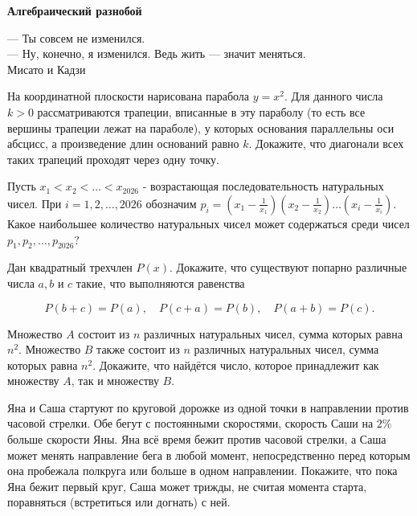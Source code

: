 \centerline{\bf \Huge Алгебраический разнобой}

\begin{flushright}
        \scriptsize{— Ты совсем не изменился.\\— Ну, конечно, я изменился. Ведь жить — значит меняться.\\Мисато и Кадзи}
\end{flushright}

На координатной плоскости нарисована парабола $y=x^2$. Для данного числа $k>0$ рассматриваются трапеции, вписанные в эту параболу (то есть все вершины трапеции лежат на параболе), у которых основания параллельны оси абсцисс, а произведение длин оснований равно $k$. Докажите, что диагонали всех таких трапеций проходят через одну точку.

Пусть $x_1<x_2<\ldots<x_{2026}$ - возрастающая последовательность натуральных чисел. При $i=1,2, \ldots, 2026$ обозначим $p_i=\left(x_1-\frac{1}{x_1}\right)\left(x_2-\frac{1}{x_2}\right) \ldots\left(x_i-\frac{1}{x_i}\right)$. Какое наибольшее количество натуральных чисел может содержаться среди чисел $p_1, p_2, \ldots, p_{2026}?$

Дан квадратный трехчлен $P(x)$. Докажите, что существуют попарно различные числа $a, b$ и $c$ такие, что выполняются равенства

$$
P(b+c)=P(a), \quad P(c+a)=P(b), \quad P(a+b)=P(c) .
$$

Множество $A$ состоит из $n$ различных натуральных чисел, сумма которых равна $n^2$. Множество $B$ также состоит из $n$ различных натуральных чисел, сумма которых равна $n^2$. Докажите, что найдётся число, которое принадлежит как множеству $A$, так и множеству $B$.

Яна и Саша стартуют по круговой дорожке из одной точки в направлении против часовой стрелки. Обе бегут с постоянными скоростями, скорость Саши на $2\%$ больше скорости Яны. Яна всё время бежит против часовой стрелки, а Саша может менять направление бега в любой момент, непосредственно перед которым она пробежала полкруга или больше в одном направлении. Покажите, что пока Яна бежит первый круг, Саша может трижды, не считая момента старта, поравняться (встретиться или догнать) с ней.